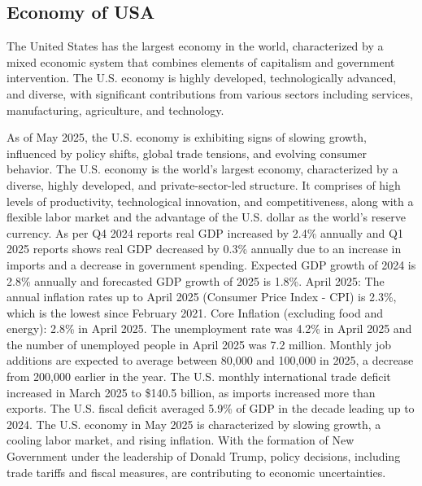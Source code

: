 \subsection{Economy of USA}
The United States has the largest economy in the world, characterized by a mixed economic system that combines elements of capitalism and government intervention. The U.S. economy is highly developed, technologically advanced, and diverse, with significant contributions from various sectors including services, manufacturing, agriculture, and technology.

As of May 2025, the U.S. economy is exhibiting signs of slowing growth, influenced by policy shifts, global trade tensions, and evolving consumer behavior. The U.S. economy is the world's largest economy, characterized by a diverse, highly developed, and private-sector-led structure. It comprises of high levels of productivity, technological innovation, and competitiveness, along with a flexible labor market and the advantage of the U.S. dollar as the world's reserve currency.
As per Q4 2024 reports real GDP increased by 2.4\% annually and Q1 2025 reports shows real GDP decreased by 0.3\% annually due to an increase in imports and a decrease in government spending. Expected GDP growth of 2024 is 2.8\% annually and forecasted GDP growth of 2025 is 1.8\%. April 2025: The annual inflation rates up to April 2025 (Consumer Price Index - CPI) is 2.3\%, which is the lowest since February 2021. Core Inflation (excluding food and energy): 2.8\% in April 2025. The unemployment rate was 4.2\% in April 2025 and the number of unemployed people in April 2025 was 7.2 million. Monthly job additions are expected to average between 80,000 and 100,000 in 2025, a decrease from 200,000 earlier in the year. The U.S. monthly international trade deficit increased in March 2025 to \$140.5 billion, as imports increased more than exports. The U.S. fiscal deficit averaged 5.9\% of GDP in the decade leading up to 2024. The U.S. economy in May 2025 is characterized by slowing growth, a cooling labor market, and rising inflation. With the formation of New Government under the leadership of Donald Trump, policy decisions, including trade tariffs and fiscal measures, are contributing to economic uncertainties. 







